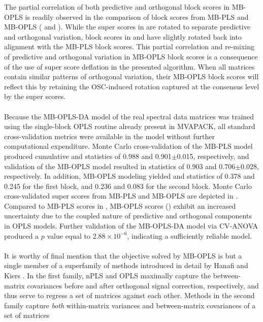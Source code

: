 \begin{doublespace}
The partial correlation of both predictive and orthogonal block scores in
MB-OPLS is readily observed in the comparison of block scores from MB-PLS
and MB-OPLS ( and ). While the
super scores in  are rotated to separate predictive
and orthogonal variation, block scores in  and
 have slightly rotated back into alignment with
the MB-PLS block scores. This partial correlation and re-mixing of
predictive and orthogonal variation in MB-OPLS block scores is a consequence
of the use of super score deflation in the presented algorithm. When all
matrices contain similar patterns of orthogonal variation, their MB-OPLS
block scores will reflect this by retaining the OSC-induced rotation captured
at the consensus level by the super scores.
\\\\
Because the MB-OPLS-DA model of the real spectral data matrices was trained
using the single-block OPLS routine already present in MVAPACK, all standard
cross-validation metrics were available in the model without further
computational expenditure. Monte Carlo cross-validation of the MB-PLS model
produced cumulative \rsqy{} and \qsq{} statistics of 0.988 and
0.901$\pm$0.015, respectively, and validation of the MB-OPLS model resulted
in statistics of 0.903 and 0.706$\pm$0.028, respectively. In addition, MB-OPLS
modeling yielded \rsqxp{} and \rsqxo{} statistics of 0.378 and 0.245 for the
first block, and 0.236 and 0.083 for the second block. Monte Carlo
cross-validated super scores from MB-PLS and MB-OPLS are depicted in
. Compared to MB-PLS scores in
, MB-OPLS scores
() exhibit an increased uncertainty due to the
coupled nature of predictive and orthogonal components in OPLS models.
Further validation of the MB-OPLS-DA model via CV-ANOVA produced
a $p$ value equal to $2.88 \times 10^{-6}$, indicating a sufficiently
reliable model.
\\\\
It is worthy of final mention that the objective solved by MB-OPLS is but a
single member of a superfamily of methods introduced in detail by Hanafi
and Kiers \cite{hanafi:csda2006}. In the first family, nPLS and OPLS maximally
capture the between-matrix covariances before and after orthogonal signal
correction, respectively, and thus serve to regress a set of matrices
against each other. Methods in the second family capture \emph{both}
within-matrix variances and between-matrix covariances of a set of matrices

\end{doublespace}
